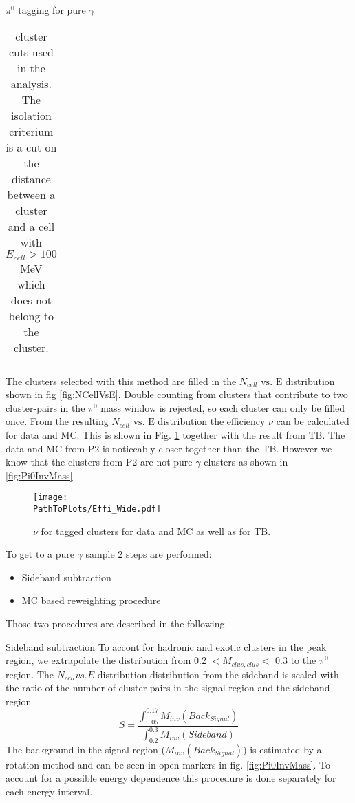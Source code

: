 \documentclass[ALICE]{ALICE_analysis_notes}
\newcommand{\PZ}{$\pi^0$\xspace}
\newcommand{\g}{$\gamma$\xspace}
\newcommand{\PathToPlots}{/home/joshua/PCG_Software/EMCal_NCellEffi/13TeVNomB_Wide/Pi0Tagging_13TeV_nom_04_26_WithTRD_WithBorderCells_1cellFT/pdf}
\begin{document}
\begin{section}{\PZ tagging for pure \g}
\begin{table}[ht!]
\begin{tabular}{ c c }
	\end{tabular}	
	
	\caption{ cluster cuts used in the analysis. The isolation criterium is a cut on the distance between a cluster and a cell with $E_{cell} > 100$ MeV which does not belong to the cluster. }
	\label{Tab:ClusCuts} 
\end{table}



The clusters selected with this method are filled in the $N_{cell}\text{ vs. E}$ distribution shown in fig \ref{fig:NCellVsE}. Double counting from clusters that contribute to two cluster-pairs in the \PZ mass window is rejected, so each cluster can only be filled once. From the resulting $N_{cell}\text{ vs. E}$ distribution the efficiency $\nu$ can be calculated for data and MC. This is shown in Fig. \ref{fig:NCellEff_Tagging1} together with the result from TB. The data and MC from P2 is noticeably closer together than the TB. However we know that the clusters from P2 are not pure \g clusters as shown in \ref{fig:Pi0InvMass}.\\
\begin{figure}[ht!]
	\centering
	\texttt{[image: \\PathToPlots/Effi\_Wide.pdf]}	
	
	\caption{  $\nu$ for tagged clusters for data and MC as well as for TB.}
	\label{fig:NCellEff_Tagging1}
\end{figure}


To get to a pure \g sample 2 steps are performed:
\begin{itemize}
	\item Sideband subtraction
	\item MC based reweighting procedure
\end{itemize}
Those two procedures are described in the following.
\begin{subsection}{Sideband subtraction}
	To accont for hadronic and exotic clusters in the peak region, we extrapolate the distribution from 0.2 $< M_{clus, clus} <$ 0.3 to the \PZ region. 
	The $N_{cell} vs. E$  distribution distribution from the sideband is scaled with the ratio of the number of cluster pairs in the signal region and the sideband region 
	\begin{equation}
	S = \frac{\int_{0.05}^{0.17} M_{inv}(Back_{Signal})}{\int_{0.2}^{0.3} M_{inv}(Sideband)}
	\end{equation}
	The background in the signal region ($M_{inv}(Back_{Signal})$) is estimated by a rotation method and can be seen in open markers in fig. \ref{fig:Pi0InvMass}. To account for a possible energy dependence this procedure is done separately for each energy interval.
\end{subsection}


\end{section}
\end{document}
